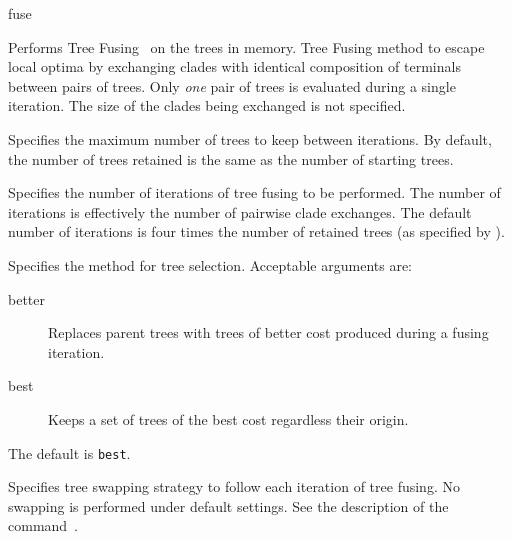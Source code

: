 \begin{command}{fuse}{}


    \begin{poydescription}
            Performs Tree Fusing~\cite{goloboff1999} on the trees in memory. Tree Fusing method to escape local optima
            by exchanging clades with identical composition of terminals between
            pairs of trees. Only \emph{one} pair of trees is evaluated during a single iteration.
            The size of the clades being exchanged is not specified.
    \end{poydescription}

    \begin{arguments}
            {Specifies the maximum number of trees to keep between iterations.
            By default, the number of trees retained is the same as the number
            of starting trees.}
            {}

            {Specifies the number of iterations of tree fusing to be performed. The
            number of iterations is effectively the number of pairwise clade exchanges. 
            The default number of iterations is four times the number of retained
            trees (as specified by ).}
            {}

            {Specifies the method for tree selection. Acceptable arguments
            are:
            \begin{description}
                \item[better] Replaces parent trees with trees of better cost
                produced during a fusing iteration.
                \item[best] Keeps a set of trees of the best cost regardless their origin.
            \end{description}
            The default is \texttt{best}.}
            {}

            {Specifies tree swapping strategy to follow each iteration of tree fusing.
            No swapping is performed under default settings.
            See the description of the command~.}
            {}

    \end{arguments}
    

\end{command}
